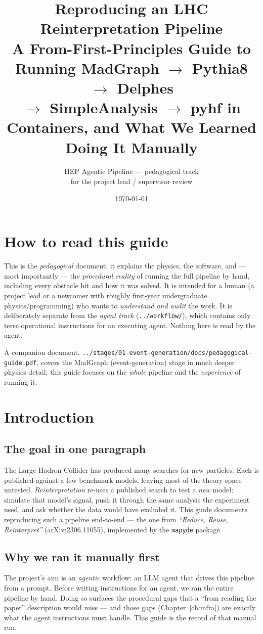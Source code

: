 \documentclass[11pt,oneside]{report}
\title{\textbf{Reproducing an LHC Reinterpretation Pipeline}\\[4pt]
\large A From-First-Principles Guide to Running MadGraph $\to$ Pythia8 $\to$ Delphes\\
$\to$ SimpleAnalysis $\to$ pyhf in Containers, and What We Learned Doing It Manually}
\author{HEP Agentic Pipeline --- pedagogical track\\\small for the project lead / supervisor review}
\date{\today}
\newcommand{\code}[1]{\texttt{#1}}
\begin{document}
\maketitle
\tableofcontents

\chapter*{How to read this guide}
This is the \emph{pedagogical} document: it explains the physics, the software, and --- most
importantly --- the \emph{procedural reality} of running the full pipeline by hand, including every
obstacle hit and how it was solved. It is intended for a human (a project lead or a newcomer with
roughly first-year undergraduate physics/programming) who wants to \emph{understand and audit} the
work. It is deliberately separate from the \emph{agent track} (\code{../workflow/}), which contains
only terse operational instructions for an executing agent. Nothing here is read by the agent.

A companion document, \code{../stages/01-event-generation/docs/pedagogical-guide.pdf}, covers the
MadGraph (event-generation) stage in much deeper physics detail; this guide focuses on the
\emph{whole} pipeline and the \emph{experience} of running it.

\chapter{Introduction}
\section{The goal in one paragraph}
The Large Hadron Collider has produced many searches for new particles. Each is published against
a few benchmark models, leaving most of the theory space untested. \emph{Reinterpretation} re-uses
a published search to test a \emph{new} model: simulate that model's signal, push it through the
same analysis the experiment used, and ask whether the data would have excluded it. This guide
documents reproducing such a pipeline end-to-end --- the one from
\emph{``Reduce, Reuse, Reinterpret''} (arXiv:2306.11055), implemented by the \code{mapyde} package.

\section{Why we ran it manually first}
The project's aim is an \emph{agentic} workflow: an LLM agent that drives this pipeline from a
prompt. Before writing instructions for an agent, we ran the entire pipeline by hand. Doing so
surfaces the procedural gaps that a ``from reading the paper'' description would miss --- and those
gaps (Chapter~\ref{ch:infra}) are exactly what the agent instructions must handle. This guide is
the record of that manual run.
\end{document}
